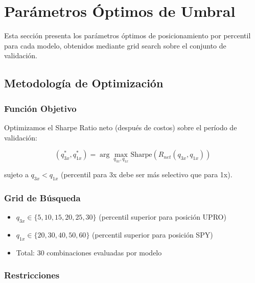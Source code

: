 
\section{Par\'ametros \'Optimos de Umbral}
\label{app:optimal_params}

Esta secci\'on presenta los par\'ametros \'optimos de posicionamiento por percentil para cada modelo, obtenidos mediante grid search sobre el conjunto de validaci\'on.

\subsection{Metodolog\'ia de Optimizaci\'on}
\label{app:opt_methodology}

\subsubsection{Funci\'on Objetivo}

Optimizamos el Sharpe Ratio neto (despu\'es de costos) sobre el per\'iodo de validaci\'on:

\begin{equation}
(q_{3x}^*, q_{1x}^*) = \arg\max_{q_{3x}, q_{1x}} \text{Sharpe}(R_{net}(q_{3x}, q_{1x}))
\end{equation}

sujeto a $q_{3x} < q_{1x}$ (percentil para 3x debe ser m\'as selectivo que para 1x).

\subsubsection{Grid de B\'usqueda}

\begin{itemize}
    \item $q_{3x} \in \{5, 10, 15, 20, 25, 30\}$ (percentil superior para posici\'on UPRO)
    \item $q_{1x} \in \{20, 30, 40, 50, 60\}$ (percentil superior para posici\'on SPY)
    \item Total: 30 combinaciones evaluadas por modelo
\end{itemize}

\subsubsection{Restricciones}


